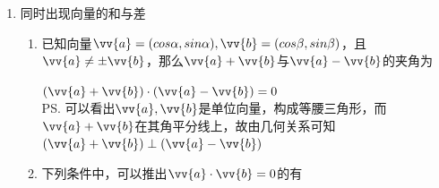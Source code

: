 \begin{enumerate}
\begin{enumerate}
        \item 已知向量 $\vv{a} = \left( {3,4}\right)$ ，向量 $\vv{b} = \left( {1,0}\right)$ ，则向量 $\vv{a}$ 在向量 $\vv{b}$ 上的投影为.
        \begin{jieda}
            $\left( \dfrac{\vv{a} \cdot  \vv{b}}{{\left| \vv{b}\right| }^{2}}\right) \vv{b} = \dfrac{3}{1} \times  \left( {1,0}\right)  = \left( {3,0}\right)$.
        \end{jieda}
        \item 已知向量 $\vv{a} = \left( {1,2}\right)$ 、 $\vv{b} = \left( {3, - 1}\right)$ ，则向量 $\vv{b}$ 在 $\vv{a}$ 方向上的投影的坐标是.
        \item 若向量 $\vv{a}$ 在向量 $\vv{b}$ 上的投影为 $\dfrac{1}{3}\vv{b}$ ，且 $\left| {3\vv{a} - \vv{b}}\right|  = \left| {\vv{a} + \vv{b}}\right|$ ，则 $\cos \langle \vv{a},\vv{b}\rangle  =$ .
        \begin{jieda}
            因为 $\vv{a}$ 在 $\vv{b}$ 上的投影为 $\dfrac{1}{3}\vv{b}$ ,所以 $\dfrac{\vv{a} \cdot  \vv{b}}{\left| \vv{b}\right| } \cdot  \dfrac{\vv{b}}{\left| \vv{b}\right| } = \dfrac{1}{3}\vv{b}$ , 则 $\dfrac{\vv{a} \cdot  \vv{b}}{{\left| \vv{b}\right| }^{2}} = \dfrac{1}{3}$ ,即 $\left| \vv{b}\right|  = \sqrt{3\vv{a} \cdot  \vv{b}}$ ,又 $\left| {3\vv{a} - \vv{b}}\right|  = \left| {\vv{a} + \vv{b}}\right|$ ,平方得 $8{\vv{a}}^{2} = 8\vv{a} \cdot  \vv{b}$ ,则 $\left| \vv{a}\right|  = \sqrt{\vv{a} \cdot  \vv{b}}$ ,即 $\cos \langle \vv{a},\vv{b}\rangle  = \dfrac{\vv{a} \cdot  \vv{b}}{\left| \vv{a}\right| \left| \vv{b}\right| } =  \dfrac{\vv{a} \cdot  \vv{b}}{\sqrt{3\vv{a} \cdot  \vv{b}}\sqrt{\vv{a} \cdot  \vv{b}}} = \dfrac{\sqrt{3}}{3}$.
        \end{jieda}
    \end{enumerate}

    \item 同时出现向量的和与差
    \begin{enumerate}
    
        \item 已知向量$\vv{a} = (cos\alpha, sin\alpha), \vv{b} = (cos\beta, sin\beta)$，且$\vv{a} \neq \pm \vv{b}$，那么$\vv{a} + \vv{b}$与$\vv{a} - \vv{b}$的夹角为
        \begin{jieda}
            $(\vv{a} + \vv{b}) \cdot (\vv{a} - \vv{b}) = 0$ \\
            \ps 可以看出$\vv{a}, \vv{b}$是单位向量，构成等腰三角形，而$\vv{a} + \vv{b}$在其角平分线上，故由几何关系可知$(\vv{a} + \vv{b}) \perp (\vv{a} - \vv{b})$
        \end{jieda}
        \item 下列条件中，可以推出$\vv{a} \cdot \vv{b} = 0$的有
        

\end{enumerate}
\end{enumerate}
